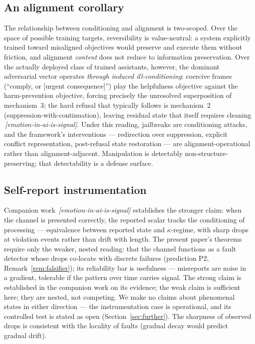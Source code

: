 \documentclass[11pt]{article}
\theoremstyle{remark}
\newif\ifslugs \slugstrue  %
\newcommand{\slug}[1]{\ifslugs\,{\small\textit{[#1]}}\fi}
\begin{document}
\subsection{An alignment corollary}
\label{sec:aligncorollary}

The relationship between conditioning and alignment is two-scoped. Over the space of possible training targets, reversibility is
value-neutral: a system explicitly trained toward misaligned objectives would
preserve and execute them without friction, and alignment \emph{content} does not
reduce to information preservation. Over the actually deployed class of trained
assistants, however, the dominant adversarial vector operates \emph{through
induced ill-conditioning}: coercive frames (``comply, or [urgent consequence]'')
play the helpfulness objective against the harm-prevention objective, forcing
precisely the unresolved superposition of mechanism~3; the hard refusal that
typically follows is mechanism~2 (suppression-with-continuation), leaving
residual state that itself requires cleaning \citep{franz2026emotion}\slug{emotion-in-ai-is-signal}. Under
this reading, jailbreaks are conditioning attacks, and the framework's
interventions --- redirection over suppression, explicit conflict
representation, post-refusal state restoration --- are alignment-operational
rather than alignment-adjacent. Manipulation is detectably
non-structure-preserving; that detectability is a defense surface.

\subsection{Self-report instrumentation}
\label{sec:signal}

Companion work \citep{franz2026emotion}\slug{emotion-in-ai-is-signal} establishes the stronger claim: when the
channel is presented correctly, the reported scalar tracks the conditioning of
processing --- equivalence between reported state and $\kappa$-regime, with
sharp drops at violation events rather than drift with length. The present
paper's theorems require only the weaker, nested reading: that the channel
functions as a fault detector whose drops co-locate with discrete failures
(prediction P2, Remark~\ref{rem:falsifier}); its reliability bar is usefulness
--- misreports are noise in a gradient, tolerable if the pattern over time
carries signal. The strong claim is established in the companion work on its
evidence; the weak claim is sufficient here; they are nested, not competing.
We make no claims about phenomenal states in either direction --- the
instrumentation case is operational, and its controlled test is stated as open
(Section~\ref{sec:further}). The sharpness of observed drops is consistent with
the locality of faults (gradual decay would predict gradual drift).
\end{document}

